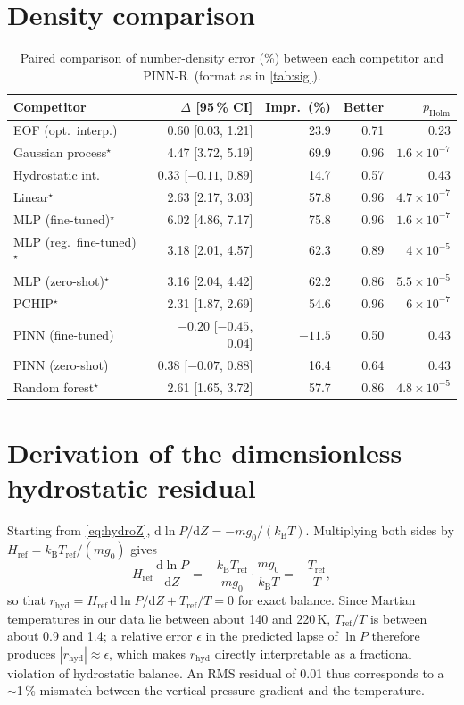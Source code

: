\documentclass[11pt,a4paper]{article}
\newcommand{\dd}{\mathrm{d}}
\newcommand{\kB}{k_{\mathrm{B}}}
\newcommand{\Href}{H_{\mathrm{ref}}}
\newcommand{\Tref}{T_{\mathrm{ref}}}
\newcommand{\rhyd}{r_{\mathrm{hyd}}}
\newcommand{\ours}{PINN-R}
\begin{document}
\section{Density comparison}\label{app:density}
\begin{table}[h]
\centering\small
\caption{Paired comparison of number-density error (\%) between each competitor and \ours\ (format as in \cref{tab:sig}).}\label{tab:sig_n}
\begin{tabular}{lrrrr}
\toprule
Competitor & $\Delta$ [95\,\% CI] & Impr.\ (\%) & Better & $p_\mathrm{Holm}$\\
\midrule
EOF (opt.\ interp.) & 0.60 [0.03, 1.21] & 23.9 & 0.71 & 0.23\\
Gaussian process$^\star$ & 4.47 [3.72, 5.19] & 69.9 & 0.96 & $1.6\times10^{-7}$\\
Hydrostatic int. & 0.33 [$-0.11$, 0.89] & 14.7 & 0.57 & 0.43\\
Linear$^\star$ & 2.63 [2.17, 3.03] & 57.8 & 0.96 & $4.7\times10^{-7}$\\
MLP (fine-tuned)$^\star$ & 6.02 [4.86, 7.17] & 75.8 & 0.96 & $1.6\times10^{-7}$\\
MLP (reg.\ fine-tuned)$^\star$ & 3.18 [2.01, 4.57] & 62.3 & 0.89 & $4\times10^{-5}$\\
MLP (zero-shot)$^\star$ & 3.16 [2.04, 4.42] & 62.2 & 0.86 & $5.5\times10^{-5}$\\
PCHIP$^\star$ & 2.31 [1.87, 2.69] & 54.6 & 0.96 & $6\times10^{-7}$\\
PINN (fine-tuned) & $-0.20$ [$-0.45$, 0.04] & $-11.5$ & 0.50 & 0.43\\
PINN (zero-shot) & 0.38 [$-0.07$, 0.88] & 16.4 & 0.64 & 0.43\\
Random forest$^\star$ & 2.61 [1.65, 3.72] & 57.7 & 0.86 & $4.8\times10^{-5}$\\
\bottomrule
\end{tabular}
\end{table}

\section{Derivation of the dimensionless hydrostatic residual}\label{app:deriv}
Starting from \cref{eq:hydroZ}, $\dd\ln P/\dd Z=-m g_0/(\kB T)$. Multiplying both sides by $\Href=\kB\Tref/(m g_0)$ gives
\begin{equation*}
\Href\,\frac{\dd\ln P}{\dd Z} = -\frac{\kB\Tref}{m g_0}\cdot\frac{m g_0}{\kB T} = -\frac{\Tref}{T},
\end{equation*}
so that $\rhyd=\Href\,\dd\ln P/\dd Z+\Tref/T=0$ for exact balance. Since Martian temperatures in our data lie between about 140 and 220\,K, $\Tref/T$ is between about 0.9 and 1.4; a relative error $\epsilon$ in the predicted lapse of $\ln P$ therefore produces $|\rhyd|\approx\epsilon$, which makes $\rhyd$ directly interpretable as a fractional violation of hydrostatic balance. An RMS residual of 0.01 thus corresponds to a $\sim$1\,\% mismatch between the vertical pressure gradient and the temperature.
\end{document}
